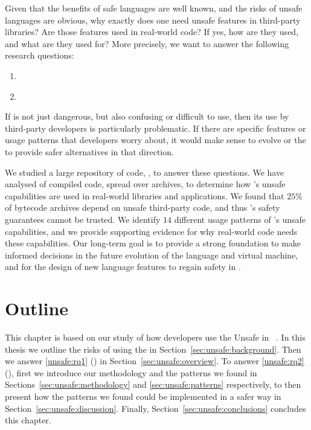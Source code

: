 Given that the benefits of safe languages are well known,
and the risks of unsafe languages are obvious,
why exactly does one need unsafe features in third-party libraries?
Are those features used in real-world code?
If yes, how are they used, and what are they used for?
More precisely, we want to answer the following research questions:

\begin{enumerate}[label=$RQ/U\arabic*:$,ref=$RQ/U\arabic*$,leftmargin=3.4\parindent]
\item\label{unsafe:rq1} {\bf \urqA} \urqAdesc{}
\item\label{unsafe:rq2} {\bf \urqB} \urqBdesc{}
\end{enumerate}

If \unsafe{} is not just dangerous,
but also confusing or difficult to use,
then its use by third-party developers is particularly problematic.
If there are specific \unsafe{} features or usage patterns that developers worry about,
it would make sense to evolve \java{} or the \jvm{} to provide safer alternatives in that direction.



We studied a large repository of \java{} code, \mavencentral{},
to answer these questions.
We have analysed \statreposize{} of compiled \java{} code,
spread over \statrepouniquearts{} \java{} archives,
to determine how \java{}'s unsafe capabilities are used in real-world
libraries and applications.
We found that $25\%$ of \java{} bytecode archives depend on unsafe
third-party \java{} code, and thus \java{}'s safety
guarantees cannot be trusted.
We identify $14$ different usage patterns of \java{}'s unsafe capabilities,
and we provide supporting evidence for why real-world code needs these capabilities.
Our long-term goal is to provide a strong foundation
to make informed decisions in the future evolution of the \java{} language and virtual machine,
and for the design of new language features to regain safety in \java{}.

\section*{Outline}

This chapter is based on our study of how developers use the Unsafe \api{} in \java{}~\citep{mastrangeloUseYourOwn2015}.
In this thesis we outline the risks of using the \unsafe{} \api{} in Section~\ref{sec:unsafe:background}.
Then we answer \ref{unsafe:rq1} (\urqA{}) in Section~\ref{sec:unsafe:overview}.
To answer \ref{unsafe:rq2} (\urqB{}),
first we introduce our methodology and the patterns we found in Sections~\ref{sec:unsafe:methodology} and \ref{sec:unsafe:patterns} respectively,
to then present how the patterns we found could be implemented in a safer way in Section~\ref{sec:unsafe:discussion}.
Finally, Section~\ref{sec:unsafe:conclusions} concludes this chapter.







